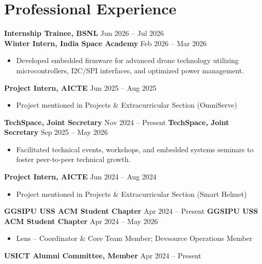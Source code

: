 \documentclass[10pt,a4paper]{article}%
\begin{document}
\section*{Professional Experience}%
\noindent \textbf{Internship Trainee, BSNL} \hfill Jun 2026 -- Jul 2026 \vspace{8pt}\\%
\noindent \textbf{Winter Intern, India Space Academy} \hfill Feb 2026 -- Mar 2026%
\begin{itemize}[leftmargin=15pt, nosep, topsep=0pt]%
\item Developed embedded firmware for advanced drone technology utilizing microcontrollers, I2C/SPI interfaces, and optimized power management.%
\end{itemize} \vspace{8pt}%
\noindent \textbf{Project Intern, AICTE} \hfill Jun 2025 -- Aug 2025%
\begin{itemize}[leftmargin=15pt, nosep, topsep=0pt]%
\item Project mentioned in Projects \& Extracurricular Section (OmniServe)%
\end{itemize} \vspace{8pt}%
\noindent \textbf{TechSpace, Joint Secretary} \hfill Nov 2024 -- Present%
\noindent \textbf{TechSpace, Joint Secretary} \hfill Sep 2025 -- May 2026%
\begin{itemize}[leftmargin=15pt, nosep, topsep=0pt]%
\item Facilitated technical events, workshops, and embedded systems seminars to foster peer-to-peer technical growth.%
\end{itemize} \vspace{8pt}%
\noindent \textbf{Project Intern, AICTE} \hfill Jun 2024 -- Aug 2024%
\begin{itemize}[leftmargin=15pt, nosep, topsep=0pt]%
\item Project mentioned in Projects \& Extracurricular Section (Smart Helmet)%
\end{itemize} \vspace{8pt}%
\noindent \textbf{GGSIPU USS ACM Student Chapter} \hfill Apr 2024 -- Present%
\noindent \textbf{GGSIPU USS ACM Student Chapter} \hfill Apr 2024 -- May 2026%
\begin{itemize}[leftmargin=15pt, nosep, topsep=0pt]%
\item Lens -- Coordinator \& Core Team Member; Devsource Operations Member%
\end{itemize} \vspace{8pt}%
\noindent \textbf{USICT Alumni Committee, Member} \hfill Apr 2024 -- Present \vspace{8pt}\\%
\end{document}
